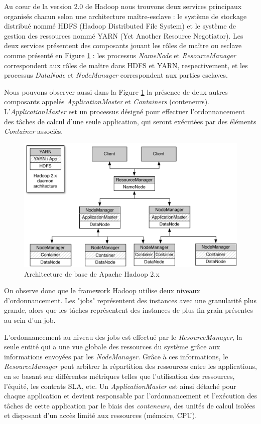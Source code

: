 Au c{\oe}ur de la version 2.0 de Hadoop nous trouvons deux services principaux organisés chacun selon une architecture maître-esclave : le système de stockage distribué nommé HDFS (Hadoop Distributed File System) et le système de gestion des ressources nommé YARN (Yet Another Resource Negotiator). Les deux services présentent des composants jouant les rôles de maître ou esclave comme présenté en Figure \ref{fig:ArquiteturaHadoop} : les processus \textit{NameNode} et \textit{ResourceManager} correspondent aux rôles de maître dans HDFS et YARN, respectivement, et les processus \textit{DataNode} et \textit{NodeManager} correspondent aux parties esclaves. 

Nous pouvons observer aussi dans la Figure \ref{fig:ArquiteturaHadoop} la présence de deux autres composants appelés \textit{ApplicationMaster} et \textit{Containers} (conteneurs). L'\textit{ApplicationMaster} est un processus désigné pour effectuer l'ordonnancement des tâches de calcul d'une seule application, qui seront exécutées par des éléments \textit{Container} associés.  

\begin{figure}[!ht]
	\centering
	\includegraphics[width=0.85\linewidth]{img/HadoopArch.pdf}
	\caption{Architecture de base de Apache Hadoop 2.x}
	\label{fig:ArquiteturaHadoop}
\end{figure}


On observe donc que le framework Hadoop utilise deux niveaux d'ordonnancement. Les "jobs" représentent des instances avec une granularité plus grande, alors que les tâches représentent des instances de plus fin grain présentes au sein d'un job. 

L'ordonnancement au niveau des jobs est effectué par le \textit{ResourceManager}, la seule entité qui a une vue globale des ressources du système grâce aux informations envoyées par les \textit{NodeManager}. Grâce à ces informations, le \textit{ResourceManager} peut arbitrer la répartition des ressources entre les applications, en se basant sur différentes métriques telles que l'utilisation des ressources, l'équité, les contrats SLA, etc. Un \textit{ApplicationMaster} est ainsi détaché pour chaque application et devient responsable par l'ordonnancement et l'exécution des tâches de cette application par le biais des \textit{conteneurs}, des unités de calcul isolées et disposant d'un accès limité aux ressources (mémoire, CPU). 

